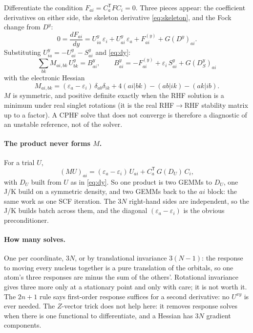 \documentclass[11pt]{article}
\newcommand{\eps}{\varepsilon}
\newcommand{\Fsk}[1]{F^{(#1)}}
\newcommand{\Dsk}[1]{D_S^{#1}}
\begin{document}
Differentiate the condition $F_{ai} = C_a^{\mathsf T} F C_i = 0$. Three
pieces appear: the coefficient derivatives on either side, the skeleton
derivative \eqref{eq:skeleton}, and the Fock change from $D^y$:
\begin{equation}
  0 = \frac{dF_{ai}}{dy}
  = U^y_{ia}\,\eps_i + U^y_{ai}\,\eps_a + \Fsk{y}_{ai} + G(D^y)_{ai}.
\end{equation}
Substituting $U^y_{ia} = -U^y_{ai} - S^y_{ai}$ and \eqref{eq:dy}:
\begin{equation}
  \boxed{\;
  \sum_{bk} M_{ai,bk}\,U^y_{bk} = B^y_{ai}, \qquad
  B^y_{ai} = -\Fsk{y}_{ai} + \eps_i\,S^y_{ai} + G(\Dsk{y})_{ai}
  \;}
  \label{eq:cphf}
\end{equation}
with the electronic Hessian
\begin{equation}
  M_{ai,bk} = (\eps_a - \eps_i)\,\delta_{ab}\delta_{ik}
  + 4(ai|bk) - (ab|ik) - (ak|ib).
  \label{eq:m}
\end{equation}
$M$ is symmetric, and positive definite exactly when the RHF solution is a
minimum under real singlet rotations (it is the real RHF$\to$RHF stability
matrix up to a factor). A CPHF solve that does not converge is therefore a
diagnostic of an unstable reference, not of the solver.

\paragraph{The product never forms $M$.} For a trial $U$,
\begin{equation}
  (MU)_{ai} = (\eps_a - \eps_i)\,U_{ai} + C_a^{\mathsf T}\,G(D_U)\,C_i,
  \label{eq:matvec}
\end{equation}
with $D_U$ built from $U$ as in \eqref{eq:dy}. So one product is two GEMMs
to $D_U$, one J/K build on a symmetric density, and two GEMMs back to the
$ai$ block: the same work as one SCF iteration. The $3N$ right-hand
sides are independent, so the J/K builds batch across them, and the
diagonal $(\eps_a - \eps_i)$ is the obvious preconditioner.

\paragraph{How many solves.} One per coordinate, $3N$, or by translational
invariance $3(N-1)$: the response to moving every nucleus together is a
pure translation of the orbitals, so one atom's three responses are minus
the sum of the others'. Rotational invariance gives three more only at a
stationary point and only with care; it is not worth it. The $2n+1$ rule
says first-order response suffices for a second derivative: no $U^{xy}$ is
ever needed. The $Z$-vector trick does not help here: it removes response
solves when there is one functional to differentiate, and a Hessian has
$3N$ gradient components.
\end{document}
